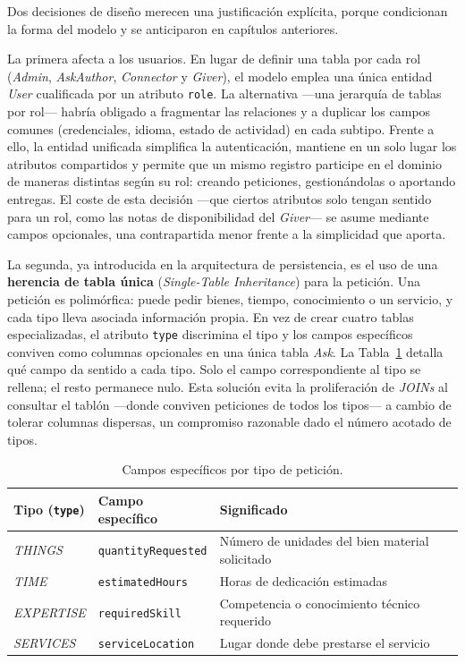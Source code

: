 \documentclass[11pt,oneside,spanish,listoffigures,listoftables]{tfgetsinf}
\begin{document}
Dos decisiones de diseño merecen una justificación explícita, porque condicionan la forma del modelo y se anticiparon en capítulos anteriores.

La primera afecta a los usuarios. En lugar de definir una tabla por cada rol (\textit{Admin}, \textit{AskAuthor}, \textit{Connector} y \textit{Giver}), el modelo emplea una única entidad \textit{User} cualificada por un atributo \texttt{role}. La alternativa —una jerarquía de tablas por rol— habría obligado a fragmentar las relaciones y a duplicar los campos comunes (credenciales, idioma, estado de actividad) en cada subtipo. Frente a ello, la entidad unificada simplifica la autenticación, mantiene en un solo lugar los atributos compartidos y permite que un mismo registro participe en el dominio de maneras distintas según su rol: creando peticiones, gestionándolas o aportando entregas. El coste de esta decisión —que ciertos atributos solo tengan sentido para un rol, como las notas de disponibilidad del \textit{Giver}— se asume mediante campos opcionales, una contrapartida menor frente a la simplicidad que aporta.

La segunda, ya introducida en la arquitectura de persistencia, es el uso de una \textbf{herencia de tabla única} (\textit{Single-Table Inheritance}) para la petición. Una petición es polimórfica: puede pedir bienes, tiempo, conocimiento o un servicio, y cada tipo lleva asociada información propia. En vez de crear cuatro tablas especializadas, el atributo \texttt{type} discrimina el tipo y los campos específicos conviven como columnas opcionales en una única tabla \textit{Ask}. La Tabla~\ref{tab:herencia-ask} detalla qué campo da sentido a cada tipo. Solo el campo correspondiente al tipo se rellena; el resto permanece nulo. Esta solución evita la proliferación de \textit{JOINs} al consultar el tablón —donde conviven peticiones de todos los tipos— a cambio de tolerar columnas dispersas, un compromiso razonable dado el número acotado de tipos.

\begin{table}[ht]
\centering
\caption[Campos específicos por tipo de petición]{Campos específicos por tipo de petición.}
\label{tab:herencia-ask}
\footnotesize
\renewcommand{\arraystretch}{1.3}
\begin{tabularx}{\textwidth}{%
  >{\raggedright\arraybackslash}p{2.6cm}%
  >{\raggedright\arraybackslash}p{3.2cm}%
  >{\raggedright\arraybackslash}X}
\toprule
\textbf{Tipo (\texttt{type})} & \textbf{Campo específico} & \textbf{Significado} \\
\midrule
\textit{THINGS} & \texttt{quantityRequested} & Número de unidades del bien material solicitado \\
\textit{TIME} & \texttt{estimatedHours} & Horas de dedicación estimadas \\
\textit{EXPERTISE} & \texttt{requiredSkill} & Competencia o conocimiento técnico requerido \\
\textit{SERVICES} & \texttt{serviceLocation} & Lugar donde debe prestarse el servicio \\
\bottomrule
\end{tabularx}
\end{table}
\end{document}
